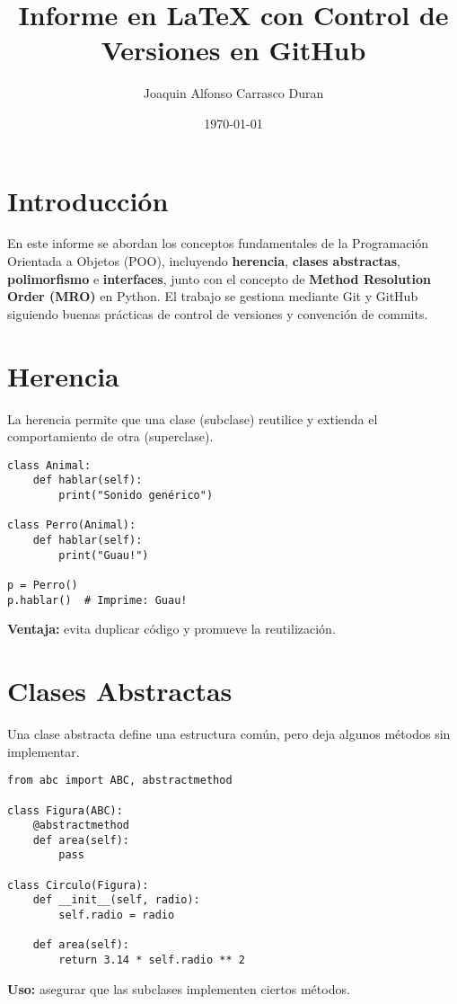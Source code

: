 \documentclass[12pt]{article}
\title{Informe en \LaTeX{} con Control de Versiones en GitHub}
\author{Joaquin Alfonso Carrasco Duran}
\date{\today}
\begin{document}
\maketitle
\tableofcontents
\newpage

\section{Introducción}
En este informe se abordan los conceptos fundamentales de la Programación Orientada a Objetos (POO), incluyendo \textbf{herencia}, \textbf{clases abstractas}, \textbf{polimorfismo} e \textbf{interfaces}, junto con el concepto de \textbf{Method Resolution Order (MRO)} en Python. El trabajo se gestiona mediante Git y GitHub siguiendo buenas prácticas de control de versiones y convención de commits.

\section{Herencia}
La herencia permite que una clase (subclase) reutilice y extienda el comportamiento de otra (superclase).  
\begin{verbatim}
class Animal:
    def hablar(self):
        print("Sonido genérico")

class Perro(Animal):
    def hablar(self):
        print("Guau!")

p = Perro()
p.hablar()  # Imprime: Guau!
\end{verbatim}

\textbf{Ventaja:} evita duplicar código y promueve la reutilización.

\section{Clases Abstractas}
Una clase abstracta define una estructura común, pero deja algunos métodos sin implementar.  
\begin{verbatim}
from abc import ABC, abstractmethod

class Figura(ABC):
    @abstractmethod
    def area(self):
        pass

class Circulo(Figura):
    def __init__(self, radio):
        self.radio = radio

    def area(self):
        return 3.14 * self.radio ** 2
\end{verbatim}

\textbf{Uso:} asegurar que las subclases implementen ciertos métodos.
\end{document}
